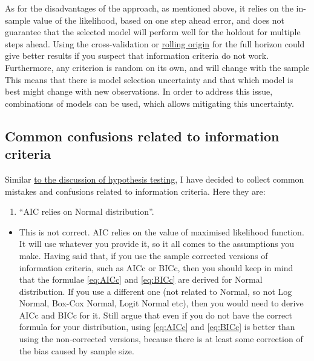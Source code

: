 \documentclass[
]{book}
\providecommand{\tightlist}{%
  \setlength{\itemsep}{0pt}\setlength{\parskip}{0pt}}
\theoremstyle{definition}
\theoremstyle{definition}
\theoremstyle{definition}
\theoremstyle{definition}
\theoremstyle{remark}
\begin{document}
As for the disadvantages of the approach, as mentioned above, it relies on the in-sample value of the likelihood, based on one step ahead error, and does not guarantee that the selected model will perform well for the holdout for multiple steps ahead. Using the cross-validation or \hyperref[rollingOrigin]{rolling origin} for the full horizon could give better results if you suspect that information criteria do not work. Furthermore, any criterion is random on its own, and will change with the sample This means that there is model selection uncertainty and that which model is best might change with new observations. In order to address this issue, combinations of models can be used, which allows mitigating this uncertainty.

\subsection{Common confusions related to information criteria}\label{informationCriteriaMistakes}

Similar \hyperref[hypothesisTestingMistakes]{to the discussion of hypothesis testing}, I have decided to collect common mistakes and confusions related to information criteria. Here they are:

\begin{enumerate}
\def\labelenumi{\arabic{enumi}.}
\tightlist
\item
  ``AIC relies on Normal distribution''.
\end{enumerate}

\begin{itemize}
\tightlist
\item
  This is not correct. AIC relies on the value of maximised likelihood function. It will use whatever you provide it, so it all comes to the assumptions you make. Having said that, if you use the sample corrected versions of information criteria, such as AICc or BICc, then you should keep in mind that the formulae \eqref{eq:AICc} and \eqref{eq:BICc} are derived for Normal distribution. If you use a different one (not related to Normal, so not Log Normal, Box-Cox Normal, Logit Normal etc), then you would need to derive AICc and BICc for it. Still \citet{Burnham2004} argue that even if you do not have the correct formula for your distribution, using \eqref{eq:AICc} and \eqref{eq:BICc} is better than using the non-corrected versions, because there is at least some correction of the bias caused by sample size.
\end{itemize}
\end{document}
